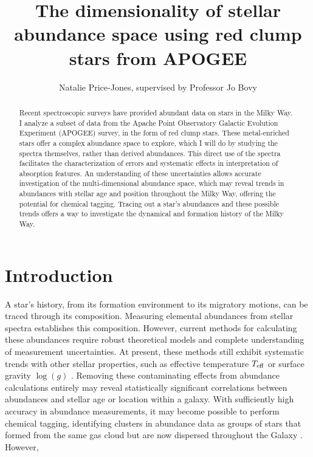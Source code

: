 \documentclass[preprint]{aastex}
\begin{document}
\title{The dimensionality of stellar abundance space using red clump stars from APOGEE}
\author{Natalie Price-Jones, supervised by Professor Jo Bovy}

\begin{abstract}
Recent spectroscopic surveys have provided abundant data on stars in the Milky Way. I analyze a subset of data from the Apache Point Observatory Galactic Evolution Experiment (APOGEE) survey, in the form of red clump stars. These metal-enriched stars offer a complex abundance space to explore, which I will do by studying the spectra themselves, rather than derived abundances. This direct use of the spectra facilitates the characterization of errors and systematic effects in interpretation of absorption features. An understanding of these uncertainties allows accurate investigation of the multi-dimensional abundance space, which may reveal trends in abundances with stellar age and position throughout the Milky Way, offering the potential for chemical tagging. Tracing out a star's abundances and these possible trends offers a way to investigate the dynamical and formation history of the Milky Way.

\end{abstract}

\section{Introduction}
\label{sec:back}

A star's history, from its formation environment to its migratory motions, can be traced through its composition. Measuring elemental abundances from stellar spectra establishes this composition. However, current methods for calculating these abundances require robust theoretical models and complete understanding of measurement uncertainties. At present, these methods still exhibit systematic trends with other stellar properties, such as effective temperature $T_{\rm eff}$ or surface gravity $\log(g)$ \citep{holtzman2015}. Removing these contaminating effects from abundance calculations entirely may reveal statistically significant correlations between abundances and stellar age or location within a galaxy. With sufficiently high accuracy in abundance measurements, it may become possible to perform chemical tagging, identifying clusters in abundance data as groups of stars that formed from the same gas cloud but are now dispersed throughout the Galaxy \citep{newgalaxy}. However, 
\end{document}
